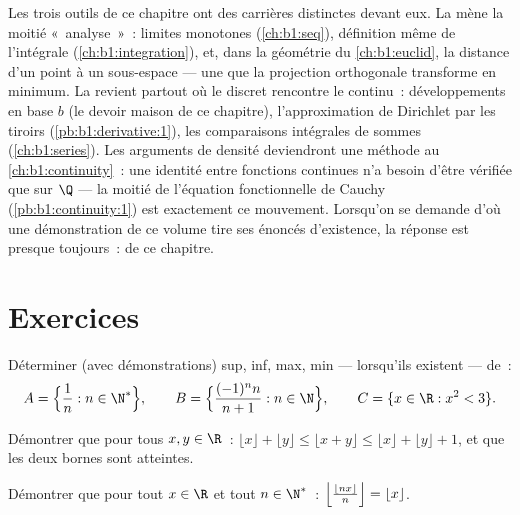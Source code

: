 \begin{remark}
Les trois outils de ce chapitre ont des carrières distinctes
devant eux. La  mène la moitié «~analyse~»~:
limites monotones (\cref{ch:b1:seq}), définition même de
l'intégrale (\cref{ch:b1:integration}), et, dans la géométrie du
\cref{ch:b1:euclid}, la distance d'un point à un sous-espace ---
une  que la projection orthogonale transforme en
minimum. La  revient partout où le discret
rencontre le continu~: développements en base $b$ (le devoir maison
de ce chapitre), l'approximation de Dirichlet par les tiroirs
(\cref{pb:b1:derivative:1}), les comparaisons intégrales de sommes
(\cref{ch:b1:series}). Les arguments de densité deviendront une
méthode au \cref{ch:b1:continuity}~: une identité entre fonctions
continues n'a besoin d'être vérifiée que sur $\Q$ --- la moitié de
l'équation fonctionnelle de Cauchy (\cref{pb:b1:continuity:1}) est
exactement ce mouvement. Lorsqu'on se demande d'où une
démonstration de ce volume tire ses énoncés d'existence, la réponse
est presque toujours~: de ce chapitre.
\end{remark}

\section{Exercices}

\begin{exercise}[$\star$]\label{exo:b1:reals:1}
Déterminer (avec démonstrations) sup, inf, max, min --- lorsqu'ils
existent --- de~:
\[
A = \Bigl\{\frac{1}{n} : n \in \N^*\Bigr\},
\qquad
B = \Bigl\{\frac{(-1)^n n}{n+1} : n \in \N\Bigr\},
\qquad
C = \{x \in \R : x^2 < 3\}.
\]
\end{exercise}

\begin{exercise}[$\star$]\label{exo:b1:reals:2}
Démontrer que pour tous $x, y \in \R$~: $\lfloor x \rfloor + \lfloor y
\rfloor \leq \lfloor x + y \rfloor \leq \lfloor x \rfloor + \lfloor y
\rfloor + 1$, et que les deux bornes sont atteintes.
\end{exercise}

\begin{exercise}[$\star$]\label{exo:b1:reals:3}
Démontrer que pour tout $x \in \R$ et tout $n \in \N^*$~:
$\Bigl\lfloor \frac{\lfloor nx \rfloor}{n} \Bigr\rfloor = \lfloor x
\rfloor$.
\end{exercise}

